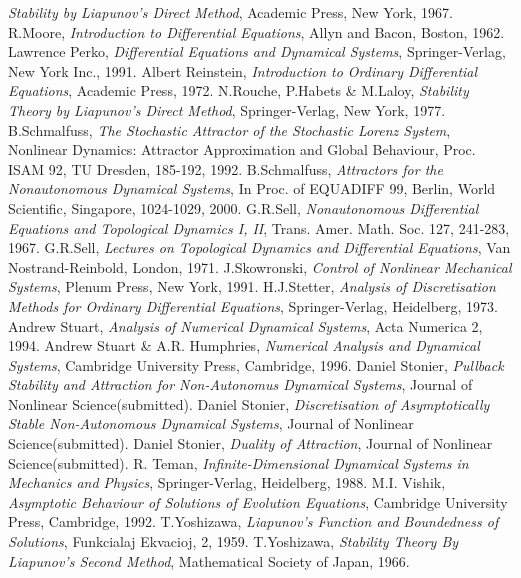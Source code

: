 \begin{thebibliography}{99}
  \emph{Stability by Liapunov's Direct Method},
  Academic Press, New York, 1967.
  R.Moore,
  \emph{Introduction to Differential Equations},
  Allyn and Bacon, Boston, 1962.
  Lawrence Perko,
  \emph{Differential Equations and Dynamical Systems},
  Springer-Verlag, New York Inc., 1991.
  Albert Reinstein,
  \emph{Introduction to Ordinary Differential Equations},
  Academic Press, 1972.
  N.Rouche, P.Habets \& M.Laloy,
  \emph{Stability Theory by Liapunov's Direct Method},
  Springer-Verlag, New York, 1977.
  B.Schmalfuss,
  \emph{The Stochastic Attractor of the Stochastic Lorenz System},
  Nonlinear Dynamics: Attractor Approximation and Global Behaviour, Proc. ISAM
  92, TU Dresden,  185-192, 1992.
  B.Schmalfuss,
  \emph{Attractors for the Nonautonomous Dynamical Systems},
  In Proc. of EQUADIFF 99, Berlin,
  World Scientific, Singapore,  1024-1029,   2000.
  G.R.Sell,
  \emph{Nonautonomous Differential Equations and Topological Dynamics I,
  II},
  Trans. Amer. Math. Soc. 127,  241-283, 1967.
  G.R.Sell,
  \emph{Lectures on Topological Dynamics and Differential Equations},
  Van Nostrand-Reinbold, London, 1971.
  J.Skowronski,
  \emph{Control of Nonlinear Mechanical Systems},
  Plenum Press, New York, 1991.
  H.J.Stetter,
  \emph{Analysis of Discretisation Methods for Ordinary Differential
  Equations},
  Springer-Verlag, Heidelberg, 1973.
  Andrew Stuart,
  \emph{Analysis of Numerical Dynamical Systems},
  Acta Numerica 2, 1994.
  Andrew Stuart \& A.R. Humphries,
  \emph{Numerical Analysis and Dynamical Systems},
  Cambridge University Press, Cambridge, 1996.
  Daniel Stonier,
  \emph{Pullback Stability and Attraction for Non-Autonomus Dynamical Systems},
  Journal of Nonlinear Science(submitted).
  Daniel Stonier,
  \emph{Discretisation of Asymptotically Stable Non-Autonomous Dynamical
       Systems},
  Journal of Nonlinear Science(submitted).
  Daniel Stonier,
  \emph{Duality of Attraction},
  Journal of Nonlinear Science(submitted).
  R. Teman,
  \emph{Infinite-Dimensional Dynamical Systems in Mechanics and
  Physics},
  Springer-Verlag, Heidelberg, 1988.
  M.I. Vishik,
  \emph{Asymptotic Behaviour of Solutions of Evolution Equations},
  Cambridge University Press, Cambridge, 1992.
  T.Yoshizawa,
  \emph{Liapunov's Function and Boundedness of Solutions},
  Funkcialaj Ekvacioj, 2, 1959.
  T.Yoshizawa,
  \emph{Stability Theory By Liapunov's Second Method},
  Mathematical Society of Japan, 1966.
\end{thebibliography}

\endinput
